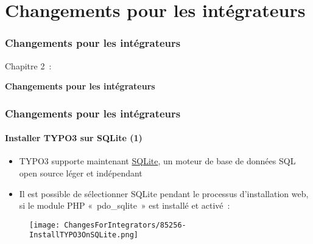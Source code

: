 %

\section{Changements pour les intégrateurs}
\begin{frame}[fragile]
	\frametitle{Changements pour les intégrateurs}

	\begin{center}\huge{Chapitre 2~:}\end{center}
	\begin{center}\huge{\color{typo3darkgrey}\textbf{Changements pour les intégrateurs}}\end{center}

\end{frame}


\begin{frame}[fragile]
	\frametitle{Changements pour les intégrateurs}
	\framesubtitle{Installer TYPO3 sur SQLite (1)}

	\begin{itemize}
		\item TYPO3 supporte maintenant \href{https://www.sqlite.org}{SQLite},
			un moteur de base de données SQL open source léger et indépendant
		\item Il est possible de sélectionner SQLite pendant le processus d'installation web,
			si le module PHP «~pdo\_sqlite~» est installé et activé~:
	\end{itemize}

	\begin{figure}
		\texttt{[image: ChangesForIntegrators/85256-InstallTYPO3OnSQLite.png]}
	\end{figure}

\end{frame}


